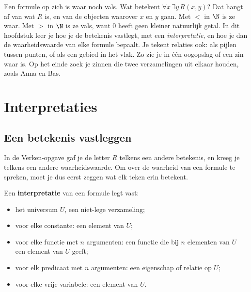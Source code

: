 Een formule op zich is waar noch vals. Wat betekent $\forall x\, \exists y\, R(x, y)$? Dat hangt af van wat $R$ is, en van de objecten waarover $x$ en $y$ gaan. Met $<$ in $\N$ is ze waar. Met $>$ in $\N$ is ze vals, want 0 heeft geen kleiner natuurlijk getal. In dit hoofdstuk leer je hoe je de betekenis vastlegt, met een \textit{interpretatie}, en hoe je dan de waarheidswaarde van elke formule bepaalt. Je tekent relaties ook: als pijlen tussen punten, of als een gebied in het vlak. Zo zie je in één oogopslag of een zin waar is. Op het einde zoek je zinnen die twee verzamelingen uit elkaar houden, zoals Anna en Bas.

\begin{oefeningen}[Start]

\end{oefeningen}


\section{Interpretaties}\label{sec:h2-interpretaties}

\subsection{Een betekenis vastleggen}

In de Verken-opgave gaf je de letter $R$ telkens een andere betekenis, en kreeg je telkens een andere waarheidswaarde. Om over de waarheid van een formule te spreken, moet je dus eerst zeggen wat elk teken erin betekent.

\begin{theorie}
Een \textbf{\textcolor{accent}{interpretatie}} van een formule legt vast:
\begin{itemize}[leftmargin=6mm,itemsep=.5mm]
\item het universum $U$, een niet-lege verzameling;
\item voor elke constante: een element van $U$;
\item voor elke functie met $n$ argumenten: een functie die bij $n$ elementen van $U$ een element van $U$ geeft;
\item voor elk predicaat met $n$ argumenten: een eigenschap of relatie op $U$;
\item voor elke vrije variabele: een element van $U$.
\end{itemize}
\end{theorie}

